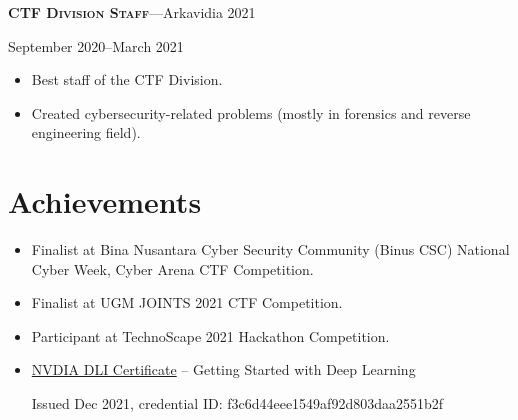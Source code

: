 \documentclass[10pt]{article}
\newcommand{\workExpVspace}{1em}
\newcommand{\orgExp}[5]{
    \noindent \textbf{\textsc{#1}}---#2

    {#3}--{#4}

    {#5}
    \vspace{\workExpVspace}
}
\begin{document}
\orgExp
    {CTF Division Staff}
    {Arkavidia 2021}
    {September 2020}
    {March 2021}
    {
        \begin{itemize}
            \item Best staff of the CTF Division.
            \item Created cybersecurity-related problems (mostly in forensics and reverse
                engineering field).
        \end{itemize}
    }

\section{Achievements}

\begin{itemize}
    \item Finalist at Bina Nusantara Cyber Security Community (Binus CSC)
        National Cyber Week, Cyber Arena CTF Competition.
    \item Finalist at UGM JOINTS 2021 CTF Competition.
    \item Participant at TechnoScape 2021 Hackathon Competition.
    \item
        \href{https://courses.nvidia.com/certificates/f3c6d44eee1549af92d803daa2551b2f}{NVDIA
        DLI Certificate} -- Getting Started with Deep Learning

        Issued Dec 2021, credential ID: f3c6d44eee1549af92d803daa2551b2f
\end{itemize}
\end{document}
